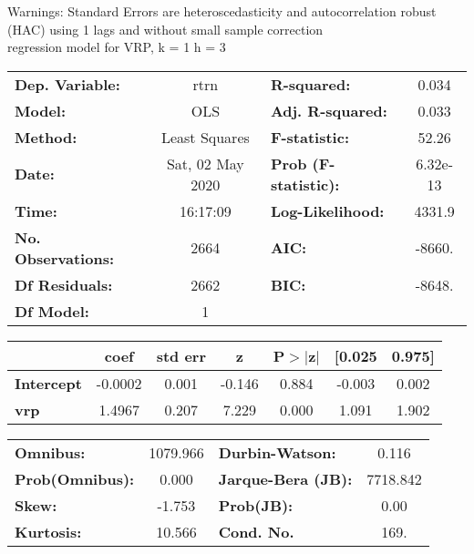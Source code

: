 Warnings: \newline
 [1] Standard Errors are heteroscedasticity and autocorrelation robust (HAC) using 1 lags and without small sample correction\\ 

regression model for VRP, k = 1 h = 3\begin{center}
\begin{tabular}{lclc}
\toprule
\textbf{Dep. Variable:}    &       rtrn       & \textbf{  R-squared:         } &     0.034   \\
\textbf{Model:}            &       OLS        & \textbf{  Adj. R-squared:    } &     0.033   \\
\textbf{Method:}           &  Least Squares   & \textbf{  F-statistic:       } &     52.26   \\
\textbf{Date:}             & Sat, 02 May 2020 & \textbf{  Prob (F-statistic):} &  6.32e-13   \\
\textbf{Time:}             &     16:17:09     & \textbf{  Log-Likelihood:    } &    4331.9   \\
\textbf{No. Observations:} &        2664      & \textbf{  AIC:               } &    -8660.   \\
\textbf{Df Residuals:}     &        2662      & \textbf{  BIC:               } &    -8648.   \\
\textbf{Df Model:}         &           1      & \textbf{                     } &             \\
\bottomrule
\end{tabular}
\begin{tabular}{lcccccc}
                   & \textbf{coef} & \textbf{std err} & \textbf{z} & \textbf{P$> |$z$|$} & \textbf{[0.025} & \textbf{0.975]}  \\
\midrule
\textbf{Intercept} &      -0.0002  &        0.001     &    -0.146  &         0.884        &       -0.003    &        0.002     \\
\textbf{vrp}       &       1.4967  &        0.207     &     7.229  &         0.000        &        1.091    &        1.902     \\
\bottomrule
\end{tabular}
\begin{tabular}{lclc}
\textbf{Omnibus:}       & 1079.966 & \textbf{  Durbin-Watson:     } &    0.116  \\
\textbf{Prob(Omnibus):} &   0.000  & \textbf{  Jarque-Bera (JB):  } & 7718.842  \\
\textbf{Skew:}          &  -1.753  & \textbf{  Prob(JB):          } &     0.00  \\
\textbf{Kurtosis:}      &  10.566  & \textbf{  Cond. No.          } &     169.  \\
\bottomrule
\end{tabular}
\end{center}

